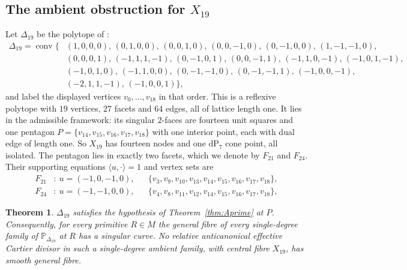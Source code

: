 \documentclass[11pt]{amsart}
\newtheorem{theorem}{Theorem}[section]
\theoremstyle{definition}
\theoremstyle{remark}
\theoremstyle{plain}
\newcommand{\PP}{\mathbb{P}}
\newcommand{\conv}{\operatorname{conv}}
\newcommand{\dP}{\mathrm{dP}}
\begin{document}
\subsection{The ambient obstruction for \texorpdfstring{$X_{19}$}{X19}}
Let $\Delta_{19}$ be the polytope of \cite[\S5.3]{PaperIII}:
\begin{equation}\label{eq:V19}
\begin{aligned}
\Delta_{19} = \conv\bigl\{
&(1,0,0,0),\,(0,1,0,0),\,(0,0,1,0),\,(0,0,-1,0),\,(0,-1,0,0),\,(1,-1,-1,0),\\
&(0,0,0,1),\,(-1,1,1,-1),\,(0,-1,0,1),\,(0,0,-1,1),\,(-1,1,0,-1),\,(-1,0,1,-1),\\
&(-1,0,1,0),\,(-1,1,0,0),\,(0,-1,-1,0),\,(0,-1,-1,1),\,(-1,0,0,-1),\\
&(-2,1,1,-1),\,(-1,0,0,1)\bigr\},
\end{aligned}
\end{equation}
and label the displayed vertices $v_0,\ldots,v_{18}$ in that order.  This is
a reflexive polytope with $19$ vertices, $27$ facets and $64$ edges, all of
lattice length one.  It lies in the admissible framework: its singular
$2$-faces are fourteen unit squares and one pentagon
$P = \{v_{14},v_{15},v_{16},v_{17},v_{18}\}$ with one interior point, each with
dual edge of length one.  So $X_{19}$ has fourteen nodes and one $\dP_7$ cone
point, all isolated.  The pentagon lies in exactly two facets, which we
denote by $F_{21}$ and $F_{24}$.  Their
supporting equations $\langle u,\cdot\rangle=1$ and vertex sets are
\[
\begin{aligned}
F_{21}&:\ u=(-1,0,-1,0), &&\{v_3,v_9,v_{10},v_{13},v_{14},v_{15},v_{16},v_{17},v_{18}\},\\
F_{24}&:\ u=(-1,-1,0,0), &&\{v_4,v_8,v_{11},v_{12},v_{14},v_{15},v_{16},v_{17},v_{18}\},
\end{aligned}
\]

\begin{theorem}\label{thm:A}
$\Delta_{19}$ satisfies the hypothesis of Theorem~\ref{thm:Aprime} at $P$.
Consequently, for every primitive $R\in M$ the general fibre of every
single-degree family of $\PP_{\Delta_{19}}$ at $R$ has a singular curve.  No
relative anticanonical effective Cartier divisor in such a single-degree
ambient family, with central fibre $X_{19}$, has smooth general fibre.
\end{theorem}
\end{document}
